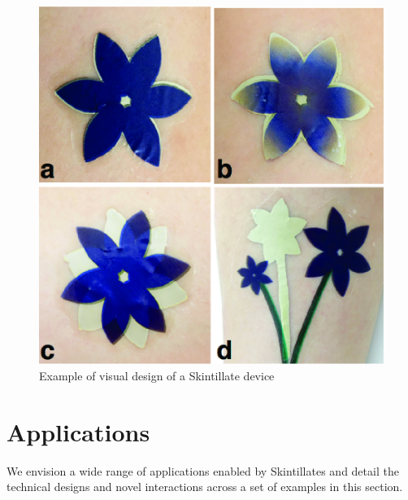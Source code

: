 \documentclass{sigchi}
\begin{document}
\begin{figure}[!b]
\centering
\includegraphics[width=0.8\columnwidth]{figures/Figure5}
\caption{Example of visual design of a Skintillate device}
\vspace{-8pt}
\label{fig:design}
\end{figure}

\section{Applications}
We envision a wide range of applications enabled by Skintillates and detail the technical designs and novel interactions across a set of examples in this section.
\end{document}
